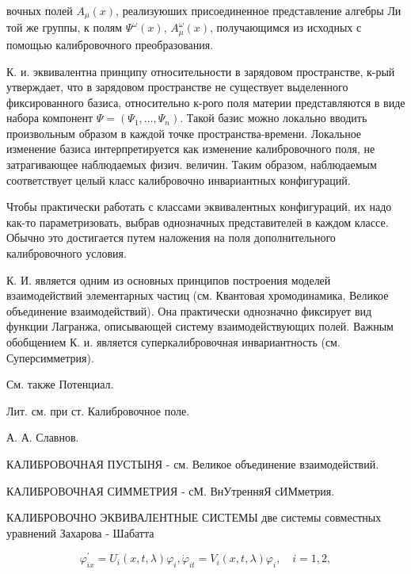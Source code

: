 \documentclass[10pt]{article}
\begin{document}
вочных полей $A_{\mu}(x)$, реализуюших присоединенное представление алгебры Ли той же группы, к полям $\Psi^{\omega}(x)$, $A_{\mu}^{\omega}(x)$, получающимся из исходных с помощью калибровочного преобразования.



К. и. эквивалентна принципу относительности в зарядовом пространстве, к-рый утверждает, что в зарядовом пространстве не существует выделенного фиксированного базиса, относительно к-рого поля материи представляются в виде набора компонент $\Psi=\left(\Psi_{1}, \ldots, \Psi_{n}\right)$. Такой базис можно локально вводить произвольным образом в каждой точке пространства-времени. Локальное изменение базиса интерпретируется как изменение калибровочного поля, не затрагивающее наблюдаемых физич. величин. Таким образом, наблюдаемым соответствует целый класс калибровочно инвариантных конфигураций.



Чтобы практически работать с классами эквивалентных конфигураций, их надо как-то параметризовать, выбрав однозначных представителей в каждом классе. Обычно это достигается путем наложения на поля дополнительного калибровочного условия.



К. И. является одним из основных принципов построения моделей взаимодействий элементарных частиц (см. Квантовая хромодинамика, Великое объединение взаимодействий). Она практически однозначно фиксирует вид функции Лагранжа, описывающей систему взаимодействующих полей. Важным обобщением К. и. является суперкалибровочная инвариантность (см. Суперсимметрия).



См. также Потенциал.



Лит. см. при ст. Калибровочное поле.



А. А. Славнов.



КАЛИБРОВОЧНАЯ ПУСТЫНЯ - см. Великое объединение взаимодействий.



КАЛИБРОВОЧНАЯ СИММЕТРИЯ - сМ. ВнУтренняЯ сИМметрия.



КАЛИБРОВОЧНО ЭКВИВАЛЕНТНЫЕ СИСТЕМЫ две системы совместных уравнений Захарова - Шабатта



\[

\varphi_{i x}^{\prime}=U_{i}(x, t, \lambda) \varphi_{i}, \dot{\varphi}_{i t}=V_{i}(x, t, \lambda) \varphi_{i}, \quad i=1,2,

\]
\end{document}
